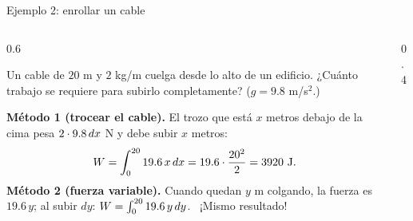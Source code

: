 \documentclass[10pt,aspectratio=169]{beamer}
\begin{document}
\begin{frame}{Ejemplo 2: enrollar un cable}
  \begin{columns}
    \begin{column}{0.6\textwidth}
      \begin{ejemplo}
        Un cable de $20$ m y $2$ kg/m cuelga desde lo alto de un edificio. ¿Cuánto trabajo se requiere para subirlo
        completamente? ($g=9.8$ m/s$^2$.)

        \textbf{Método 1 (trocear el cable).} El trozo que está $x$ metros debajo de la cima pesa $2\cdot9.8\,dx$ N y debe
        subir $x$ metros:
        \[ W=\int_0^{20}19.6\,x\dx=19.6\cdot\frac{20^2}{2}=3920\ \text{J}. \]
        \textbf{Método 2 (fuerza variable).} Cuando quedan $y$ m colgando, la fuerza es $19.6\,y$; al subir $dy$:
        $W=\int_0^{20}19.6\,y\,dy$. \ ¡Mismo resultado!
      \end{ejemplo}
    \end{column}
    \begin{column}{0.4\textwidth}
      \centering
    \end{column}
  \end{columns}
\end{frame}
\end{document}
